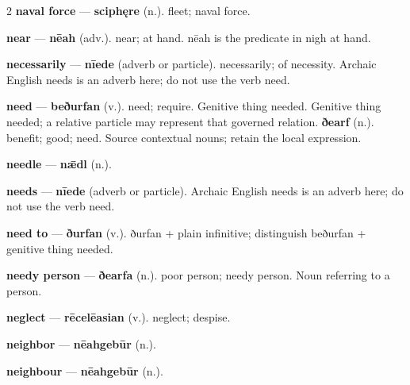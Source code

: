 \begin{multicols}{2}
\textbf{naval force} — \textbf{sciphęre} (n.). fleet; naval force.\par
\textbf{near} — \textbf{nēah} (adv.). near; at hand. nēah is the predicate in nigh at hand.\par
\textbf{necessarily} — \textbf{nīede} (adverb or particle). necessarily; of necessity. Archaic English needs is an adverb here; do not use the verb need.\par
\textbf{need} — \textbf{beðurfan} (v.). need; require. Genitive thing needed. Genitive thing needed; a relative particle may represent that governed relation. \textbf{ðearf} (n.). benefit; good; need. Source contextual nouns; retain the local expression.\par
\textbf{needle} — \textbf{nǣdl} (n.).\par
\textbf{needs} — \textbf{nīede} (adverb or particle). Archaic English needs is an adverb here; do not use the verb need.\par
\textbf{need to} — \textbf{ðurfan} (v.). ðurfan + plain infinitive; distinguish beðurfan + genitive thing needed.\par
\textbf{needy person} — \textbf{ðearfa} (n.). poor person; needy person. Noun referring to a person.\par
\textbf{neglect} — \textbf{rēcelēasian} (v.). neglect; despise.\par
\textbf{neighbor} — \textbf{nēahgebūr} (n.).\par
\textbf{neighbour} — \textbf{nēahgebūr} (n.).\par

\end{multicols}
